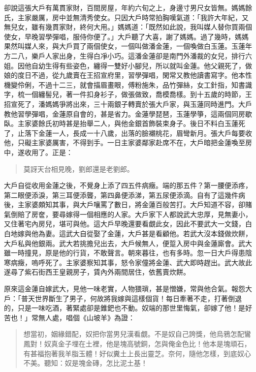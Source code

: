卻說這張大戶有萬貫家財，百間房屋，年約六旬之上，身邊寸男尺女皆無。媽媽餘氏，主家嚴厲，房中並無清秀使女。只因大戶時常拍胸嘆氣道：「我許大年紀，又無兒女，雖有幾貫家財，終何大用。」媽媽道：「既然如此說，我叫媒人替你買兩個使女，早晚習學彈唱，服侍你便了。」大戶聽了大喜，謝了媽媽。過了幾時，媽媽果然叫媒人來，與大戶買了兩個使女，一個叫做潘金蓮，一個喚做白玉蓮。玉蓮年方二八，樂戶人家出身，生得白凈小巧。這潘金蓮卻是南門外潘裁的女兒，排行六姐。因他自幼生得有些姿色，纏得一雙好小腳兒，所以就叫金蓮。他父親死了，做娘的度日不過，從九歲賣在王招宣府里，習學彈唱，閑常又教他讀書寫字。他本性機變伶俐，不過十二三，就會描眉畫眼，傅粉施朱，品竹彈絲，女工針指，知書識字，梳一個纏髻兒，著一件扣身衫子，做張做致，喬模喬樣。到十五歲的時節，王招宣死了，潘媽媽爭將出來，三十兩銀子轉賣於張大戶家，與玉蓮同時進門。大戶教他習學彈唱，金蓮原自會的，甚是省力。金蓮學琵琶，玉蓮學箏，這兩個同房歇臥。主家婆餘氏初時甚是抬舉二人，與他金銀首飾裝束身子。後日不料白玉蓮死了，止落下金蓮一人，長成一十八歲，出落的臉襯桃花，眉彎新月。張大戶每要收他，只礙主家婆厲害，不得到手。一日主家婆鄰家赴席不在，大戶暗把金蓮喚至房中，遂收用了。正是：
\begin{quote}
莫訝天台相見晚，劉郎還是老劉郎。
\end{quote}

大戶自從收用金蓮之後，不覺身上添了四五件病癥。端的那五件？第一腰便添疼，第二眼便添淚，第三耳便添聾，第四鼻便添涕，第五尿便添滴。自有了這幾件病後，主家婆頗知其事，與大戶嚷罵了數日，將金蓮百般苦打。大戶知道不容，卻賭氣倒賠了房奩，要尋嫁得一個相應的人家。大戶家下人都說武大忠厚，見無妻小，又住著宅內房兒，堪可與他。這大戶早晚還要看覷此女，因此不要武大一文錢，白白地嫁與他為妻。這武大自從娶了金蓮，大戶甚是看顧他。若武大沒本錢做炊餅，大戶私與他銀兩。武大若挑擔兒出去，大戶候無人，便踅入房中與金蓮廝會。武大雖一時撞見，原是他的行貨，不敢聲言。朝來暮往，也有多時。忽一日大戶得患陰寒病癥，嗚呼死了。主家婆察知其事，怒令家僮將金蓮、武大即時趕出。武大故此遂尋了紫石街西王皇親房子，賃內外兩間居住，依舊賣炊餅。

原來這金蓮自嫁武大，見他一味老實，人物猥瑣，甚是憎嫌，常與他合氣。報怨大戶：「普天世界斷生了男子，何故將我嫁與這樣個貨！每日牽著不走，打著倒退的，只是一味吃酒，著緊處卻是錐鈀也不動。奴端的那世里悔氣，卻嫁了他！是好苦也！」常無人處，唱個《山坡羊》為證：
\begin{quote}
想當初，姻緣錯配，奴把你當男兒漢看覷。不是奴自己誇獎，他烏鴉怎配鸞鳳對！奴真金子埋在土裡，他是塊高號銅，怎與俺金色比！他本是塊頑石，有甚福抱著我羊脂玉體！好似糞土上長出靈芝。奈何，隨他怎樣，到底奴心不美。聽知：奴是塊金磚，怎比泥土基！
\end{quote}


